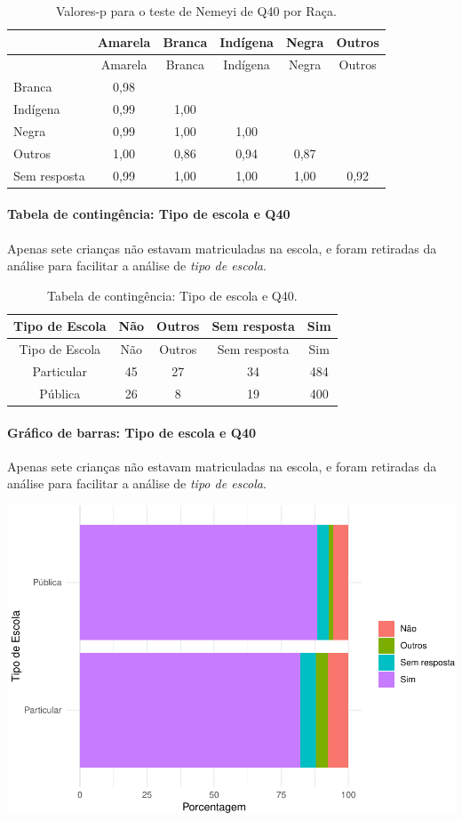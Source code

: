 \documentclass[]{article}
\let\oldparagraph\paragraph
\renewcommand{\paragraph}[1]{\oldparagraph{#1}\mbox{}}
\begin{document}
\begin{longtable}[]{@{}lccccc@{}}
\caption{\label{tab:unnamed-chunk-1585}Valores-p para o teste de Nemeyi de Q40 por Raça.}\tabularnewline
\toprule
& Amarela & Branca & Indígena & Negra & Outros\tabularnewline
\midrule
\endfirsthead
\toprule
& Amarela & Branca & Indígena & Negra & Outros\tabularnewline
\midrule
\endhead
Branca & 0,98 & & & &\tabularnewline
Indígena & 0,99 & 1,00 & & &\tabularnewline
Negra & 0,99 & 1,00 & 1,00 & &\tabularnewline
Outros & 1,00 & 0,86 & 0,94 & 0,87 &\tabularnewline
Sem resposta & 0,99 & 1,00 & 1,00 & 1,00 & 0,92\tabularnewline
\bottomrule
\end{longtable}

\cleardoublepage

\hypertarget{tabela-de-continguxeancia-tipo-de-escola-e-q40}{%
\paragraph{Tabela de contingência: Tipo de escola e Q40}\label{tabela-de-continguxeancia-tipo-de-escola-e-q40}}

Apenas sete crianças não estavam matriculadas na escola, e foram retiradas da análise para facilitar a análise de \emph{tipo de escola}.

\begin{longtable}[]{@{}ccccc@{}}
\caption{\label{tab:unnamed-chunk-1586}Tabela de contingência: Tipo de escola e Q40.}\tabularnewline
\toprule
Tipo de Escola & Não & Outros & Sem resposta & Sim\tabularnewline
\midrule
\endfirsthead
\toprule
Tipo de Escola & Não & Outros & Sem resposta & Sim\tabularnewline
\midrule
\endhead
Particular & 45 & 27 & 34 & 484\tabularnewline
Pública & 26 & 8 & 19 & 400\tabularnewline
\bottomrule
\end{longtable}

\hypertarget{gruxe1fico-de-barras-tipo-de-escola-e-q40}{%
\paragraph{Gráfico de barras: Tipo de escola e Q40}\label{gruxe1fico-de-barras-tipo-de-escola-e-q40}}

Apenas sete crianças não estavam matriculadas na escola, e foram retiradas da análise para facilitar a análise de \emph{tipo de escola}.

\begin{center}\includegraphics[width=0.75\linewidth]{relatorio_covid19_files/figure-latex/unnamed-chunk-1587-1} \end{center}
\end{document}
